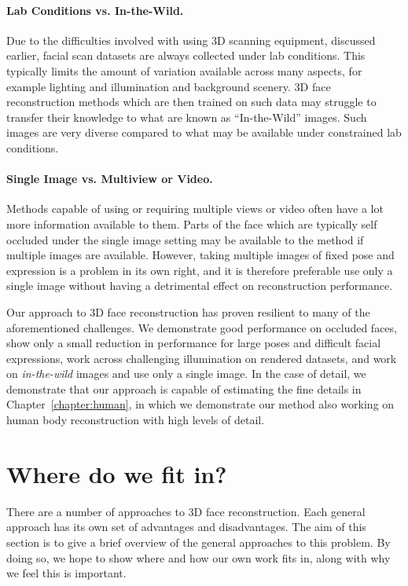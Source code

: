 \paragraph{Lab Conditions vs. In-the-Wild.} Due to the difficulties
involved with using 3D scanning equipment, discussed earlier, facial
scan datasets are always collected under lab conditions. This
typically limits the amount of variation available across many
aspects, for example lighting and illumination and background
scenery. 3D face reconstruction methods which are then trained on such
data may struggle to transfer their knowledge to what are known as
``In-the-Wild'' images. Such images are very diverse compared to what
may be available under constrained lab conditions.

\paragraph{Single Image vs. Multiview or Video.} Methods capable of
using or requiring multiple views or video often have a lot more
information available to them. Parts of the face which are typically
self occluded under the single image setting may be available to the
method if multiple images are available. However, taking multiple
images of fixed pose and expression is a problem in its own right, and
it is therefore preferable use only a single image without having a
detrimental effect on reconstruction performance.

Our approach to 3D face reconstruction has proven resilient to many of
the aforementioned challenges. We demonstrate good performance on
occluded faces, show only a small reduction in performance for large
poses and difficult facial expressions, work across challenging
illumination on rendered datasets, and work on \textit{in-the-wild}
images and use only a single image. In the case of detail, we
demonstrate that our approach is capable of estimating the fine
details in Chapter~\ref{chapter:human}, in which we demonstrate our
method also working on human body reconstruction with high levels of
detail.

\section{Where do we fit in?}

There are a number of approaches to 3D face reconstruction. Each
general approach has its own set of advantages and disadvantages. The
aim of this section is to give a brief overview of the general
approaches to this problem. By doing so, we hope to show where and how
our own work fits in, along with why we feel this is important.

